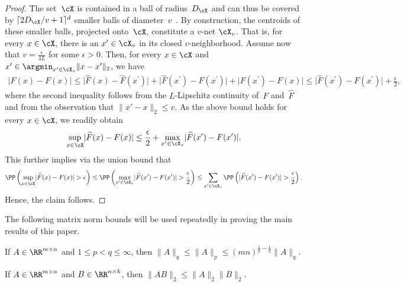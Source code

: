 \documentclass[11pt]{article}
\let\hat\widehat
\begin{document}
\begin{proof}
The set~$\cX$ is contained in a ball of radius~$D_\cX$ and can thus be covered by $\lceil 2D_{\cX}/v+1\rceil^{d}$ smaller balls of diameter~$v$~\cite[Lemma~5.7]{wainwright2019high}. By construction, the centroids of these smaller balls, projected onto~$\cX$, constitute a $v$-net $\cX_v$. That is, for every $x\in\cX$, there is an $x'\in\cX_v$ in its closed $v$-neighborhood. Assume now that $v=\frac{\epsilon}{4L}$ for some $\epsilon>0$. Then, for every $x\in\cX$ and $x^\prime\in\argmin_{x^\prime\in\cX_v}\|x-x^\prime\|_2$, we have
\begin{align*}
    \lvert \hat F(x) - F(x) \rvert \leq \lvert \hat F(x) - \hat F(x^\prime) \rvert + \lvert  \hat F(x^\prime) - F(x^\prime) \rvert + \lvert F(x^\prime) - F(x) \rvert \leq \lvert  \hat F(x^\prime) - F(x^\prime) \rvert+ \frac{\epsilon}{2} ,
\end{align*}
where the second inequality follows from the $L$-Lipschitz continuity of~$F$ and~$\hat F$ and from the observation that $\|x'-x\|_2\leq v$. As the above bound holds for every $x\in\cX$, we readily obtain
\begin{align*}
    \sup_{x\in\cX} \lvert \hat F(x) - F(x) \rvert  \leq \frac{\epsilon}{2} + \max_{x^\prime\in\cX_v} \lvert  \hat F(x^\prime) - F(x^\prime) \rvert.
\end{align*}
This further implies via the union bound that
\begin{align*}
    \PP\left(\sup_{x\in\cX} \lvert \hat F(x) - F(x) \rvert > \epsilon \right) \leq \PP\left( \max_{x^\prime\in\cX_v} \lvert  \hat F(x^\prime) - F(x^\prime) \rvert > \frac{\epsilon}{2} \right) \leq \sum_{x^\prime\in\cX_v} \PP\left( \lvert  \hat F(x^\prime) - F(x^\prime) \rvert  > \frac{\epsilon}{2}\right).
\end{align*}
Hence, the claim follows.
\end{proof}

The following matrix norm bounds will be used repeatedly in proving the main results of this paper.

\begin{lemma}\label{lemma:matrix-inequality-pq}
    If $A\in\RR^{m\times n}$ and $1\leq p <q\leq\infty$, then
    $\|A\|_q \leq \|A\|_p \leq (mn)^{\frac{1}{p}-\frac{1}{q}}\|A\|_q$.
\end{lemma}

\begin{lemma}\label{lemma:cauchy-schwarz-matrix}
    If $A\in\RR^{m\times n}$ and $B\in\RR^{n\times k}$, then $\|A B\|_2 \leq \|A\|_2 \|B\|_2$.
\end{lemma} 
\end{document}
